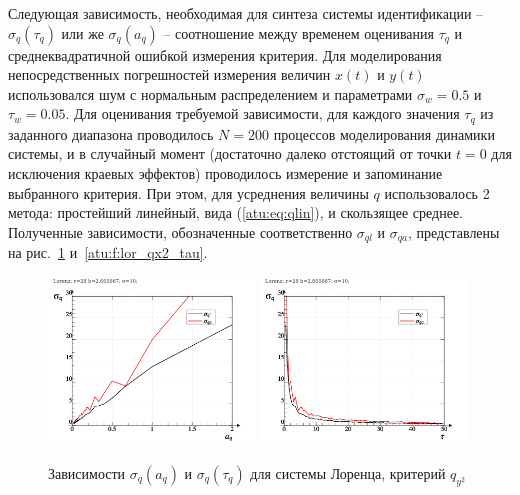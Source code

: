 Следующая зависимость, необходимая для синтеза
системы идентификации -- $ \sigma_q(\tau_q) $
или же  $ \sigma_q(a_q) $ -- соотношение между
временем оценивания $\tau_q$ и среднеквадратичной
ошибкой измерения критерия.
Для моделирования непосредственных погрешностей измерения величин
$x(t)$ и $y(t)$ использовался шум с нормальным распределением
и параметрами $\sigma_w=0.5$ и $\tau_w=0.05$.
Для оценивания требуемой зависимости, для каждого
значения $\tau_q$ из заданного диапазона
проводилось $N=200$ процессов моделирования динамики системы,
и в случайный момент (достаточно далеко отстоящий от точки $t=0$ для исключения краевых эффектов)
проводилось измерение и запоминание выбранного критерия.
При этом, для усреднения величины $q$ использовалось 2 метода:
простейший линейный, вида (\ref{atu:eq:qlin}), и скользящее среднее.
Полученные зависимости, обозначенные соответственно
$\sigma_{ql}$ и $\sigma_{qa}$, представлены на
рис.~\ref{atu:f:lor_qy2_tau} и~\ref{atu:f:lor_qx2_tau}.


\begin{figure}[h!]
\begin{center}
  \includegraphics[width=0.49\textwidth]{p/cha/lor/lor_q_tau-p_aq_sd.png}
  \hfill
  \includegraphics[width=0.49\textwidth]{p/cha/lor/lor_q_tau-p_tau_sd.png}
\end{center}
  \caption{Зависимости $\sigma_{q}(a_q)$ и $\sigma_{q}(\tau_q)$ для системы Лоренца, критерий  $q_{y^2}$}
\label{atu:f:lor_qy2_tau}
\end{figure}


